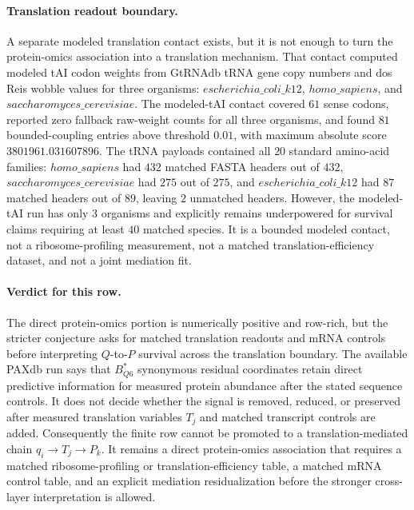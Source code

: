 \paragraph{Translation readout boundary.}
A separate modeled translation contact exists, but it is not enough to turn the protein-omics association into a translation mechanism.  That contact computed modeled tAI codon weights from GtRNAdb tRNA gene copy numbers and dos Reis wobble values for three organisms: $escherichia\_coli\_k12$, $homo\_sapiens$, and $saccharomyces\_cerevisiae$.  The modeled-tAI contact covered $61$ sense codons, reported zero fallback raw-weight counts for all three organisms, and found $81$ bounded-coupling entries above threshold $0.01$, with maximum absolute score $3801961.031607896$.  The tRNA payloads contained all $20$ standard amino-acid families: $homo\_sapiens$ had $432$ matched FASTA headers out of $432$, $saccharomyces\_cerevisiae$ had $275$ out of $275$, and $escherichia\_coli\_k12$ had $87$ matched headers out of $89$, leaving $2$ unmatched headers.  However, the modeled-tAI run has only $3$ organisms and explicitly remains underpowered for survival claims requiring at least $40$ matched species.  It is a bounded modeled contact, not a ribosome-profiling measurement, not a matched translation-efficiency dataset, and not a joint mediation fit.

\paragraph{Verdict for this row.}
The direct protein-omics portion is numerically positive and row-rich, but the stricter conjecture asks for matched translation readouts and mRNA controls before interpreting $Q$-to-$P$ survival across the translation boundary.  The available PAXdb run says that $B^{*}_{Q6}$ synonymous residual coordinates retain direct predictive information for measured protein abundance after the stated sequence controls.  It does not decide whether the signal is removed, reduced, or preserved after measured translation variables $T_j$ and matched transcript controls are added.  Consequently the finite row cannot be promoted to a translation-mediated chain $q_i \to T_j \to P_k$.  It remains a direct protein-omics association that requires a matched ribosome-profiling or translation-efficiency table, a matched mRNA control table, and an explicit mediation residualization before the stronger cross-layer interpretation is allowed.


